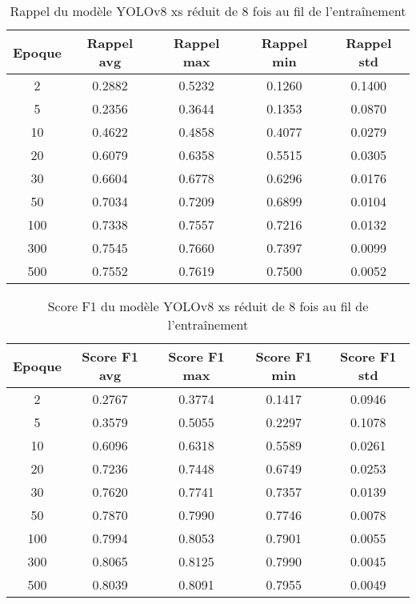 \begin{table}[!ht]
    \caption{Rappel du modèle YOLOv8 xs réduit de 8 fois au fil de l'entraînement}
    \label{tab:yolov8xs_reduced8x_rappel}
    \centering
    \begin{tabular}{ |c||c|c|c|c|  }
        \hline
        \rowcolor{gray!50}
        Epoque & Rappel avg & Rappel max & Rappel min & Rappel std\\
        \hline
        2 & 0.2882 & 0.5232 & 0.1260 & 0.1400\\
        5 & 0.2356 & 0.3644 & 0.1353 & 0.0870\\
        10 & 0.4622 & 0.4858 & 0.4077 & 0.0279\\
        20 & 0.6079 & 0.6358 & 0.5515 & 0.0305\\
        30 & 0.6604 & 0.6778 & 0.6296 & 0.0176\\
        50 & 0.7034 & 0.7209 & 0.6899 & 0.0104\\
        100 & 0.7338 & 0.7557 & 0.7216 & 0.0132\\
        300 & 0.7545 & 0.7660 & 0.7397 & 0.0099\\
        500 & 0.7552 & 0.7619 & 0.7500 & 0.0052\\
        \hline
    \end{tabular}
\end{table}

\begin{table}[!ht]
    \caption{Score F1 du modèle YOLOv8 xs réduit de 8 fois au fil de l'entraînement}
    \label{tab:yolov8xs_reduced8x_f1score}
    \centering
    \begin{tabular}{ |c||c|c|c|c|  }
        \hline
        \rowcolor{gray!50}
        Epoque & Score F1 avg & Score F1 max & Score F1 min & Score F1 std\\
        \hline
        2 & 0.2767 & 0.3774 & 0.1417 & 0.0946\\
        5 & 0.3579 & 0.5055 & 0.2297 & 0.1078\\
        10 & 0.6096 & 0.6318 & 0.5589 & 0.0261\\
        20 & 0.7236 & 0.7448 & 0.6749 & 0.0253\\
        30 & 0.7620 & 0.7741 & 0.7357 & 0.0139\\
        50 & 0.7870 & 0.7990 & 0.7746 & 0.0078\\
        100 & 0.7994 & 0.8053 & 0.7901 & 0.0055\\
        300 & 0.8065 & 0.8125 & 0.7990 & 0.0045\\
        500 & 0.8039 & 0.8091 & 0.7955 & 0.0049\\
        \hline
    \end{tabular}
\end{table}

